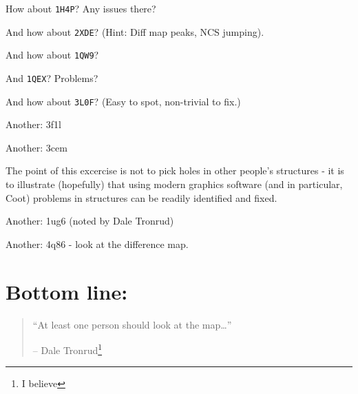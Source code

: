 \documentclass{article}
\begin{document}
How about \texttt{1H4P}?  Any issues there?

And how about \texttt{2XDE}? %
(Hint: Diff map peaks, NCS jumping).

And how about \texttt{1QW9}?

And \texttt{1QEX}?  Problems?

And how about \texttt{3L0F}? (Easy to spot, non-trivial to
fix.) %

Another: 3f1l

Another:  3cem 




The point of this excercise is not to pick holes in other people's
structures - it is to illustrate (hopefully) that using modern
graphics software (and in particular, Coot) problems in structures can
be readily identified and fixed.  


Another: 1ug6 (noted by Dale Tronrud)

Another: 4q86 - look at the difference map.  

\section*{Bottom line:}

\begin{quotation}
  ``At least one person should look at the map\ldots'' 

  -- Dale Tronrud\footnote{I believe}
\end{quotation}
\end{document}
